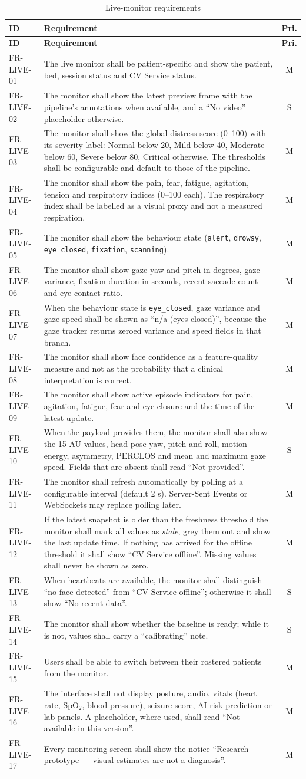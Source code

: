 \documentclass[a4paper,11pt]{scrreprt}
\makeatletter
\newenvironment{reqtable}[1]{%
  \small
  \begin{longtable}{@{}>{\ttfamily\footnotesize}p{2.55cm}>{\raggedright\arraybackslash}p{10.7cm}c@{}}
  \caption{#1}\\
  \toprule \textbf{ID} & \textbf{Requirement} & \textbf{Pri.}\\ \midrule
  \endfirsthead
  \toprule \textbf{ID} & \textbf{Requirement} & \textbf{Pri.}\\ \midrule
  \endhead
  \bottomrule
  \endfoot
}{%
  \end{longtable}\normalsize
}
\newcommand{\req}[3]{#1 & #2 & #3 \\ \midrule}
\newcommand{\code}[1]{\texttt{#1}}
\makeatother
\begin{document}
\begin{reqtable}{Live-monitor requirements}
\req{FR-LIVE-01}{The live monitor shall be patient-specific and show the patient, bed, session status and CV Service status.}{M}
\req{FR-LIVE-02}{The monitor shall show the latest preview frame with the pipeline's annotations when available, and a ``No video'' placeholder otherwise.}{S}
\req{FR-LIVE-03}{The monitor shall show the global distress score (0--100) with its severity label: Normal below 20, Mild below 40, Moderate below 60, Severe below 80, Critical otherwise. The thresholds shall be configurable and default to those of the pipeline.}{M}
\req{FR-LIVE-04}{The monitor shall show the pain, fear, fatigue, agitation, tension and respiratory indices (0--100 each). The respiratory index shall be labelled as a visual proxy and not a measured respiration.}{M}
\req{FR-LIVE-05}{The monitor shall show the behaviour state (\code{alert}, \code{drowsy}, \code{eye_closed}, \code{fixation}, \code{scanning}).}{M}
\req{FR-LIVE-06}{The monitor shall show gaze yaw and pitch in degrees, gaze variance, fixation duration in seconds, recent saccade count and eye-contact ratio.}{M}
\req{FR-LIVE-07}{When the behaviour state is \code{eye_closed}, gaze variance and gaze speed shall be shown as ``n/a (eyes closed)'', because the gaze tracker returns zeroed variance and speed fields in that branch.}{M}
\req{FR-LIVE-08}{The monitor shall show face confidence as a feature-quality measure and not as the probability that a clinical interpretation is correct.}{M}
\req{FR-LIVE-09}{The monitor shall show active episode indicators for pain, agitation, fatigue, fear and eye closure and the time of the latest update.}{M}
\req{FR-LIVE-10}{When the payload provides them, the monitor shall also show the 15 AU values, head-pose yaw, pitch and roll, motion energy, asymmetry, PERCLOS and mean and maximum gaze speed. Fields that are absent shall read ``Not provided''.}{S}
\req{FR-LIVE-11}{The monitor shall refresh automatically by polling at a configurable interval (default 2 s). Server-Sent Events or WebSockets may replace polling later.}{M}
\req{FR-LIVE-12}{If the latest snapshot is older than the freshness threshold the monitor shall mark all values as \emph{stale}, grey them out and show the last update time. If nothing has arrived for the offline threshold it shall show ``CV Service offline''. Missing values shall never be shown as zero.}{M}
\req{FR-LIVE-13}{When heartbeats are available, the monitor shall distinguish ``no face detected'' from ``CV Service offline''; otherwise it shall show ``No recent data''.}{S}
\req{FR-LIVE-14}{The monitor shall show whether the baseline is ready; while it is not, values shall carry a ``calibrating'' note.}{S}
\req{FR-LIVE-15}{Users shall be able to switch between their rostered patients from the monitor.}{M}
\req{FR-LIVE-16}{The interface shall not display posture, audio, vitals (heart rate, SpO$_2$, blood pressure), seizure score, AI risk-prediction or lab panels. A placeholder, where used, shall read ``Not available in this version''.}{M}
\req{FR-LIVE-17}{Every monitoring screen shall show the notice ``Research prototype --- visual estimates are not a diagnosis''.}{M}
\end{reqtable}
\end{document}
